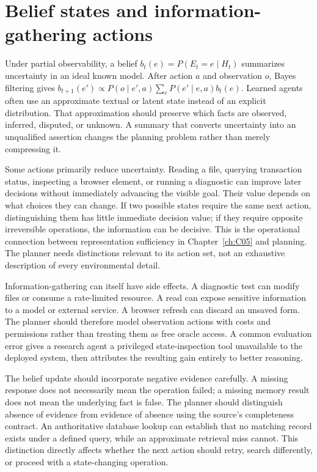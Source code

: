 \section{Belief states and information-gathering actions}
\label{sec:C10:beliefs}
Under partial observability, a belief $b_t(e)=P(E_t=e\mid H_t)$ summarizes uncertainty in an ideal known model. After action $a$ and observation $o$, Bayes filtering gives $b_{t+1}(e')\propto P(o\mid e',a)\sum_eP(e'\mid e,a)b_t(e)$. Learned agents often use an approximate textual or latent state instead of an explicit distribution. That approximation should preserve which facts are observed, inferred, disputed, or unknown. A summary that converts uncertainty into an unqualified assertion changes the planning problem rather than merely compressing it.

Some actions primarily reduce uncertainty. Reading a file, querying transaction status, inspecting a browser element, or running a diagnostic can improve later decisions without immediately advancing the visible goal. Their value depends on what choices they can change. If two possible states require the same next action, distinguishing them has little immediate decision value; if they require opposite irreversible operations, the information can be decisive. This is the operational connection between representation sufficiency in Chapter~\ref{ch:C05} and planning. The planner needs distinctions relevant to its action set, not an exhaustive description of every environmental detail.

Information-gathering can itself have side effects. A diagnostic test can modify files or consume a rate-limited resource. A read can expose sensitive information to a model or external service. A browser refresh can discard an unsaved form. The planner should therefore model observation actions with costs and permissions rather than treating them as free oracle access. A common evaluation error gives a research agent a privileged state-inspection tool unavailable to the deployed system, then attributes the resulting gain entirely to better reasoning.

The belief update should incorporate negative evidence carefully. A missing response does not necessarily mean the operation failed; a missing memory result does not mean the underlying fact is false. The planner should distinguish absence of evidence from evidence of absence using the source's completeness contract. An authoritative database lookup can establish that no matching record exists under a defined query, while an approximate retrieval miss cannot. This distinction directly affects whether the next action should retry, search differently, or proceed with a state-changing operation.

